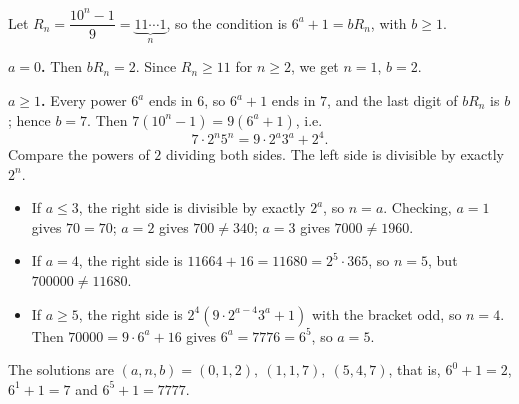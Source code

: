 Let $R_n=\dfrac{10^n-1}{9}=\underbrace{11\cdots1}_{n}$, so the condition is $6^a+1=bR_n$, with $b\ge1$.

\textbf{$a=0$.} Then $bR_n=2$. Since $R_n\ge11$ for $n\ge2$, we get $n=1$, $b=2$.

\textbf{$a\ge1$.} Every power $6^a$ ends in $6$, so $6^a+1$ ends in $7$, and the last digit of $bR_n$ is $b$; hence $b=7$. Then $7(10^n-1)=9(6^a+1)$, i.e.
\[
7\cdot2^n5^n=9\cdot2^a3^a+2^4 .
\]
Compare the powers of $2$ dividing both sides. The left side is divisible by exactly $2^n$.
\begin{itemize}
\item If $a\le3$, the right side is divisible by exactly $2^a$, so $n=a$. Checking, $a=1$ gives $70=70$; $a=2$ gives $700\ne340$; $a=3$ gives $7000\ne1960$.
\item If $a=4$, the right side is $11664+16=11680=2^5\cdot365$, so $n=5$, but $700000\ne11680$.
\item If $a\ge5$, the right side is $2^4(9\cdot2^{a-4}3^a+1)$ with the bracket odd, so $n=4$. Then $70000=9\cdot6^a+16$ gives $6^a=7776=6^5$, so $a=5$.
\end{itemize}
The solutions are $\boxed{(a,n,b)=(0,1,2),\ (1,1,7),\ (5,4,7)}$, that is, $6^0+1=2$, $6^1+1=7$ and $6^5+1=7777$.
